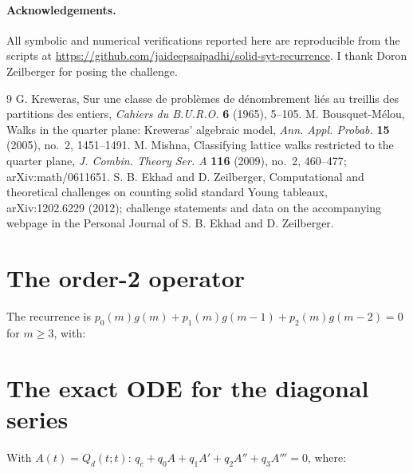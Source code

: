 \documentclass[11pt]{article}
\begin{document}
\paragraph{Acknowledgements.} All symbolic and numerical verifications reported here are reproducible from the scripts at \url{https://github.com/jaideepsaipadhi/solid-syt-recurrence}. I thank Doron Zeilberger for posing the challenge.

\begin{thebibliography}{9}
 G. Kreweras, Sur une classe de probl\`emes de d\'enombrement li\'es au treillis des partitions des entiers, \emph{Cahiers du B.U.R.O.} \textbf{6} (1965), 5--105.
 M. Bousquet-M\'elou, Walks in the quarter plane: Kreweras' algebraic model, \emph{Ann. Appl. Probab.} \textbf{15} (2005), no.~2, 1451--1491.
 M. Mishna, Classifying lattice walks restricted to the quarter plane, \emph{J. Combin. Theory Ser. A} \textbf{116} (2009), no.~2, 460--477; arXiv:math/0611651.
 S. B. Ekhad and D. Zeilberger, Computational and theoretical challenges on counting solid standard Young tableaux, arXiv:1202.6229 (2012); challenge statements and data on the accompanying webpage in the Personal Journal of S. B. Ekhad and D. Zeilberger.
\end{thebibliography}

\appendix
\section{The order-2 operator}\label{app:op}
The recurrence is $p_0(m)g(m) + p_1(m)g(m-1) + p_2(m)g(m-2) = 0$ for $m\ge3$, with:

\section{The exact ODE for the diagonal series}\label{app:ode}
With $A(t)=Q_d(t;t)$: $q_c + q_0A + q_1A' + q_2A'' + q_3A''' = 0$, where:

\end{document}
